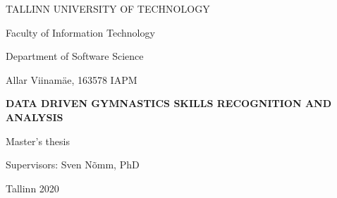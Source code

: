 \begin{titlepage}
    \begin{center}
        \large
        TALLINN UNIVERSITY OF TECHNOLOGY 
        
        Faculty of Information Technology
        
        Department of Software Science
        
        \vspace*{6.5cm}
        
        
         Allar Viinamäe, 163578 IAPM
        
        \vspace{0.3cm}
        
        \Large
        
        
        \textbf{DATA DRIVEN GYMNASTICS SKILLS RECOGNITION AND ANALYSIS}
        
        \large
        \vspace{0.3cm}
        Master's thesis
        
        \vspace{2cm}
        
        \begin{flushright}
        Supervisors: Sven Nõmm, PhD
        \end{flushright}
        
        
        \vfill
        

        \vspace{0.8cm}
        
        Tallinn 
        2020
        
    \end{center}
\end{titlepage}